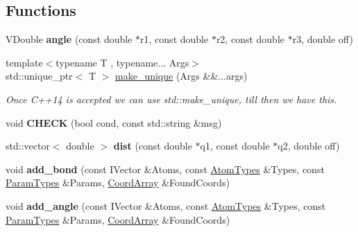 \subsection*{Functions}
\begin{DoxyCompactItemize}
\item 
V\+Double {\bfseries angle} (const double $\ast$r1, const double $\ast$r2, const double $\ast$r3, double off)\hypertarget{namespaceFManII_ac145eebe2971f15a0053dbd0926c7b9a}{}\label{namespaceFManII_ac145eebe2971f15a0053dbd0926c7b9a}

\item 
{\footnotesize template$<$typename T , typename... Args$>$ }\\std\+::unique\+\_\+ptr$<$ T $>$ \hyperlink{namespaceFManII_a57e9a715666f24e78bd0025020e2c08e}{make\+\_\+unique} (Args \&\&...args)\hypertarget{namespaceFManII_a57e9a715666f24e78bd0025020e2c08e}{}\label{namespaceFManII_a57e9a715666f24e78bd0025020e2c08e}

\begin{DoxyCompactList}\small\item\em Once C++14 is accepted we can use std\+::make\+\_\+unique, till then we have this. \end{DoxyCompactList}\item 
void {\bfseries C\+H\+E\+CK} (bool cond, const std\+::string \&msg)\hypertarget{namespaceFManII_a70d1cfbb2f83f24521e0f0a31df25fd4}{}\label{namespaceFManII_a70d1cfbb2f83f24521e0f0a31df25fd4}

\item 
std\+::vector$<$ double $>$ {\bfseries dist} (const double $\ast$q1, const double $\ast$q2, double off)\hypertarget{namespaceFManII_a7570392168766203fc6452d09cad01cf}{}\label{namespaceFManII_a7570392168766203fc6452d09cad01cf}

\item 
void {\bfseries add\+\_\+bond} (const I\+Vector \&Atoms, const \hyperlink{namespaceFManII_add1cccdf9425a71de6835b2631b84db8}{Atom\+Types} \&Types, const \hyperlink{namespaceFManII_a16edca665b5dfcdf9b3995844ad01bb5}{Param\+Types} \&Params, \hyperlink{namespaceFManII_a988516dba14437f483faf9f3c6d40c25}{Coord\+Array} \&Found\+Coords)\hypertarget{namespaceFManII_a3218348ba8f97811883d92317dcfea94}{}\label{namespaceFManII_a3218348ba8f97811883d92317dcfea94}

\item 
void {\bfseries add\+\_\+angle} (const I\+Vector \&Atoms, const \hyperlink{namespaceFManII_add1cccdf9425a71de6835b2631b84db8}{Atom\+Types} \&Types, const \hyperlink{namespaceFManII_a16edca665b5dfcdf9b3995844ad01bb5}{Param\+Types} \&Params, \hyperlink{namespaceFManII_a988516dba14437f483faf9f3c6d40c25}{Coord\+Array} \&Found\+Coords)\hypertarget{namespaceFManII_a2d03d3143239d96b6ab10e2d1c56af66}{}\label{namespaceFManII_a2d03d3143239d96b6ab10e2d1c56af66}


\end{DoxyCompactItemize}

